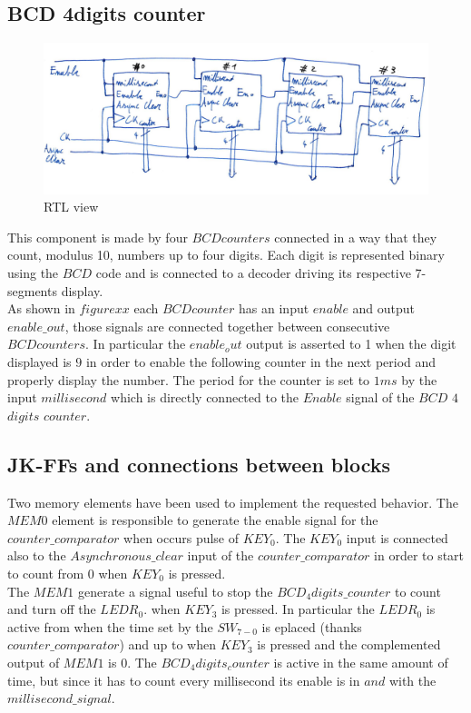 \documentclass[12pt]{article}
\begin{document}
\subsection{BCD 4digits counter}
\begin{figure}[h]
	\centering
	\includegraphics[scale = 0.6]{immagini/RTBCD.jpg}
	\caption{RTL view}
\end{figure}

This component is made by four $BCDcounters$ connected in a way that they count, modulus 10, numbers up to four digits. Each digit is represented binary using the $BCD$ code and is connected to a decoder driving its respective 7-segments display. \\
As shown in $figure xx$ each $BCDcounter$ has an input $enable$ and output $enable\_out$, those signals are connected together between consecutive $BCDcounters$. In particular the $enable_out$ output is asserted to 1 when the digit displayed is $9$ in order to enable the following counter in the next period and properly display the number. The period for the counter is set to $1ms$ by the input $millisecond$ which is directly connected to the $Enable$ signal of the  $BCD$ $4$ $digits$ $counter$.
\subsection{JK-FFs and connections between blocks}
Two memory elements have been used to implement the requested behavior. 
The $MEM0$ element is responsible to generate the enable signal for the $counter\_comparator$ when occurs pulse of $KEY_0$. The $KEY_0$ input is connected also to the $Asynchronous\_clear$ input of the $counter\_comparator$ in order to start to count from $0$ when $KEY_0$ is pressed.
\\The $MEM1$ generate a signal useful to stop the $BCD_4digits\_counter$ to count and turn off the $LEDR_0$. when $KEY_3$ is pressed. In particular the $LEDR_0$ is active from when the time set by the $SW_{7-0}$ is eplaced (thanks $counter\_comparator$) and up to when $KEY_3$ is pressed and the complemented output of $MEM1$ is $0$. The $BCD_4digits_counter$ is active in the same amount of time, but since it has to count every millisecond its enable is in $and$ with the $millisecond\_signal$.
\end{document}
